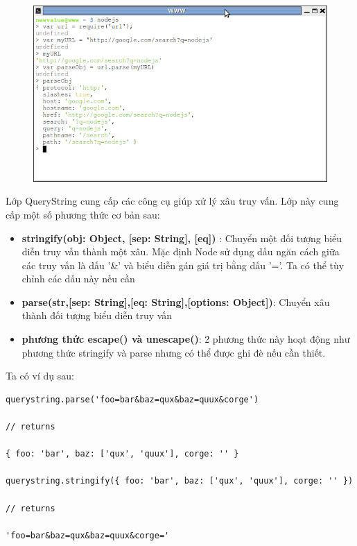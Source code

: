 	\begin{figure}[h]
		\centering
		\includegraphics[scale=0.7]{3_3_7}	
	\end{figure}

	Lớp QueryString cung cấp các công cụ giúp  xử lý xâu truy vấn. Lớp này cung cấp một số phương thức cơ bản sau:\\
	
	\begin{itemize}
		\item \textbf{stringify(obj: Object, [sep: String], [eq])} : Chuyển một đối tượng biểu diễn truy vấn thành một xâu. Mặc định Node sử dụng dấu ngăn cách giữa các truy vấn là dấu '\&' và biểu diễn gán giá trị bằng dấu '='. Ta có thể tùy chỉnh các dấu này nếu cần
		\item \textbf{parse(str,[sep: String],[eq: String],[options: Object])}: Chuyển xâu thành đối tượng biểu diễn truy vấn
		\item \textbf{phương thức escape() và unescape()}: 2 phương thức này hoạt động như phương thức stringify và parse nhưng có thể được ghi đè nếu cần thiết.
	\end{itemize}
	
	Ta có ví dụ sau:\\
	
	\begin{verbatim}
querystring.parse('foo=bar&baz=qux&baz=quux&corge')

// returns

{ foo: 'bar', baz: ['qux', 'quux'], corge: '' }

querystring.stringify({ foo: 'bar', baz: ['qux', 'quux'], corge: '' })

// returns

'foo=bar&baz=qux&baz=quux&corge='
		
	\end{verbatim}
	

